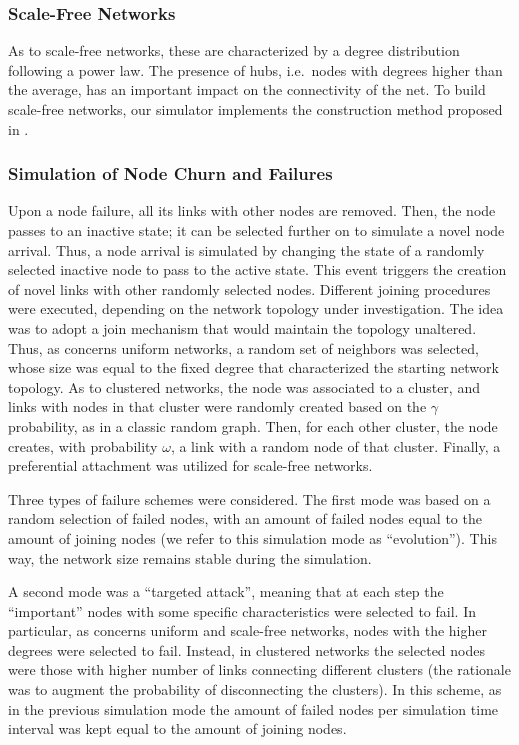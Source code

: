 \documentclass[10pt, conference, compsocconf]{IEEEtran}
\begin{document}
\subsubsection{Scale-Free Networks}
As to scale-free networks, these are characterized by a degree distribution following a power law. 
The presence of hubs, i.e.~nodes with degrees higher than the average, has an important impact on the connectivity of the net. To build scale-free networks, our simulator implements the construction method proposed in \cite{Aiello00arandom}.

\subsubsection{Simulation of Node Churn and Failures}

Upon a node failure, all its links with other nodes are removed. Then, the node passes to an inactive state; it can be selected further on to simulate a novel node arrival.
Thus, a node arrival is simulated by changing the state of a randomly selected inactive node to pass to the active state. This event triggers the creation of novel links with other randomly selected nodes. 
Different joining procedures were executed, depending on the network topology under investigation. The idea was to adopt a join mechanism that would maintain the topology unaltered.
Thus, as concerns uniform networks, a random set of neighbors was selected, whose size was equal to the fixed degree that characterized the starting network topology.
As to clustered networks, the node was associated to a cluster, and links with nodes in that cluster were randomly created based on the $\gamma$ probability, as in a classic random graph. Then, for each other cluster, the node creates, with probability $\omega$, a link with a random node of that cluster.
Finally, a preferential attachment was utilized for scale-free networks.

Three types of failure schemes were considered. The first mode was based on a random selection of failed nodes, with an amount of failed nodes equal to the amount of joining nodes (we refer to this simulation mode as ``evolution''). This way, the network size remains stable during the simulation. 

A second mode was a ``targeted attack'', meaning that at each step the ``important'' nodes with some specific characteristics were selected to fail. In particular, as concerns uniform and scale-free networks, nodes with the higher degrees were selected to fail. Instead, in clustered networks the selected nodes were those with higher number of links connecting different clusters (the rationale was to augment the probability of disconnecting the clusters).
In this scheme, as in the previous simulation mode the amount of failed nodes per simulation time interval was kept equal to the amount of joining nodes.
\end{document}
